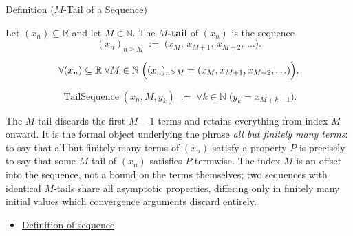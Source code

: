 \begin{definitionbox}{Definition ($M$-Tail of a Sequence)}
\begin{definition}
\label{def:m-tail}

Let $(x_n) \subseteq \mathbb{R}$ and let $M \in \mathbb{N}$. The
\textbf{$M$-tail} of $(x_n)$ is the sequence
\[
    (x_n)_{n \ge M} \;:=\; \bigl(x_M,\, x_{M+1},\, x_{M+2},\, \ldots\bigr).
\]
\end{definition}
\end{definitionbox}

\begin{remark*}
\[
\forall (x_n) \subseteq \mathbb{R} \;\forall M \in \mathbb{N}
\;\Bigl(
    (x_n)_{n \ge M} = (x_M,x_{M+1},x_{M+2},\ldots)
\Bigr).
\]
\end{remark*}

\begin{remark*}
\[
\operatorname{TailSequence}(x_n,M,y_k)
\;:=\;
\forall k \in \mathbb{N}\;\bigl(y_k = x_{M+k-1}\bigr).
\]
\end{remark*}

\begin{remark*}[Interpretation]
The $M$-tail discards the first $M - 1$ terms and retains everything
from index $M$ onward. It is the formal object underlying the phrase
\emph{all but finitely many terms}: to say that all but finitely many
terms of $(x_n)$ satisfy a property $P$ is precisely to say that some
$M$-tail of $(x_n)$ satisfies $P$ termwise. The index $M$ is an offset
into the sequence, not a bound on the terms themselves; two sequences
with identical $M$-tails share all asymptotic properties, differing
only in finitely many initial values which convergence arguments
discard entirely.
\end{remark*}

\begin{remark*}[Dependencies]
\begin{itemize}
  \item \hyperref[def:sequence]{Definition of sequence}
\end{itemize}
\end{remark*}



